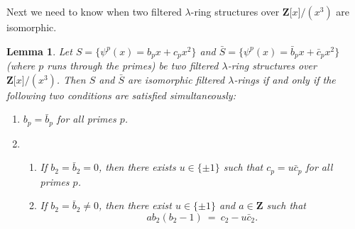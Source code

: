 \documentclass[reqno,11pt]{amsart}
\numberwithin{equation}{subsection}  %
\newtheorem{lemma}[subsection]{Lemma}
\newcommand{\bZ}{\mathbf{Z}}
\begin{document}
Next we need to know when two filtered $\lambda$-ring structures over $\bZ \lbrack x \rbrack/(x^3)$ are isomorphic.


\medskip
\begin{lemma}
\label{lem2:n=3}
Let $S = \lbrace \psi^p(x) = b_p x + c_p x^2 \rbrace$ and $\bar{S} = \lbrace \psi^p(x) = \bar{b}_p x + \bar{c}_p x^2 \rbrace$ (where $p$ runs through the primes) be two filtered $\lambda$-ring structures over $\bZ \lbrack x \rbrack/(x^3)$.  Then $S$ and $\bar{S}$ are isomorphic filtered $\lambda$-rings if and only if the following two conditions are satisfied simultaneously: 
   \begin{enumerate}
   \item $b_p = \bar{b}_p$ for all primes $p$.
   \item 
       \begin{enumerate}
       \item If $b_2 = \bar{b}_2 = 0$, then there exists $u \in \lbrace \pm 1 \rbrace$ such that $c_p = u \bar{c}_p$ for all primes $p$.
       \item If $b_2 = \bar{b}_2 \not= 0$, then there exist $u \in \lbrace \pm 1 \rbrace$ and $a \in \bZ$ such that 
       \[
       ab_2(b_2 - 1) ~=~ c_2 - u\bar{c}_2.
       \]
       \end{enumerate}
   \end{enumerate}
\end{lemma}
\end{document}
